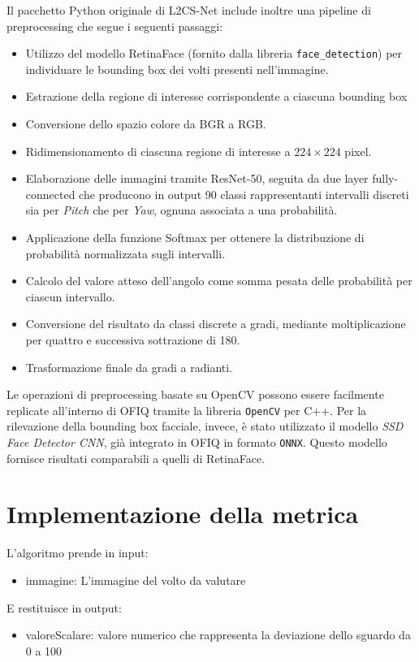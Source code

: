 \documentclass[12pt,a4paper,openright,twoside]{book}
\begin{document}
Il pacchetto Python originale di L2CS-Net include inoltre una pipeline di preprocessing che segue i seguenti passaggi:  
\begin{itemize}
    \item Utilizzo del modello RetinaFace (fornito dalla libreria \texttt{face\_detection}) per individuare le bounding box dei volti presenti nell'immagine.
    \item Estrazione della regione di interesse corrispondente a ciascuna bounding box
    \item Conversione dello spazio colore da BGR a RGB.
    \item Ridimensionamento di ciascuna regione di interesse a $224 \times 224$ pixel.
    \item Elaborazione delle immagini tramite ResNet-50, seguita da due layer fully-connected che producono in output 90 classi rappresentanti intervalli discreti sia per \textit{Pitch} che per \textit{Yaw}, ognuna associata a una probabilità.
    \item Applicazione della funzione Softmax per ottenere la distribuzione di probabilità normalizzata sugli intervalli.
    \item Calcolo del valore atteso dell'angolo come somma pesata delle probabilità per ciascun intervallo.
    \item Conversione del risultato da classi discrete a gradi, mediante moltiplicazione per quattro e successiva sottrazione di 180.
    \item Trasformazione finale da gradi a radianti.
\end{itemize}

Le operazioni di preprocessing basate su OpenCV possono essere facilmente replicate all'interno di OFIQ tramite la libreria \texttt{OpenCV} per C++.  
Per la rilevazione della bounding box facciale, invece, è stato utilizzato il modello \textit{SSD Face Detector CNN}, già integrato in OFIQ in formato \texttt{ONNX}. Questo modello fornisce risultati comparabili a quelli di RetinaFace.


\section{Implementazione della metrica}

L'algoritmo prende in input:
\begin{itemize}
    \item immagine: L'immagine del volto da valutare
\end{itemize}
E restituisce in output:
\begin{itemize}
    \item valoreScalare: valore numerico che rappresenta la deviazione dello sguardo da 0 a 100
\end{itemize}
\end{document}
